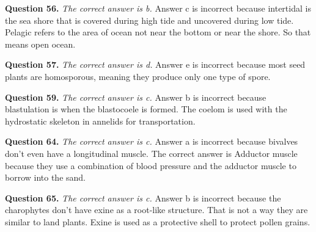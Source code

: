 \documentclass{article}
\begin{document}
\textbf{Question 56.} \textit{The correct answer is b.} Answer c is incorrect
because intertidal is the sea shore that is covered during high tide and
uncovered during low tide. Pelagic refers to the area of ocean not near the
bottom or near the shore. So that means open ocean.

\textbf{Question 57.} \textit{The correct answer is d.} Answer e is incorrect
because most seed plants are homosporous, meaning they produce only one type of
spore.

\textbf{Question 59.} \textit{The correct answer is c.} Answer b is incorrect
because blastulation is when the blastocoele is formed. The coelom is used with
the hydrostatic skeleton in annelids for transportation.

\textbf{Question 64.} \textit{The correct answer is c.} Answer a is incorrect
because bivalves don't even have a longitudinal muscle. The correct answer is
Adductor muscle because they use a combination of blood pressure and the
adductor muscle to borrow into the sand.

\textbf{Question 65.} \textit{The correct answer is c.} Answer b is incorrect
because the charophytes don't have exine as a root-like structure. That is not a
way they are similar to land plants. Exine is used as a protective shell to
protect pollen grains.
\end{document}
